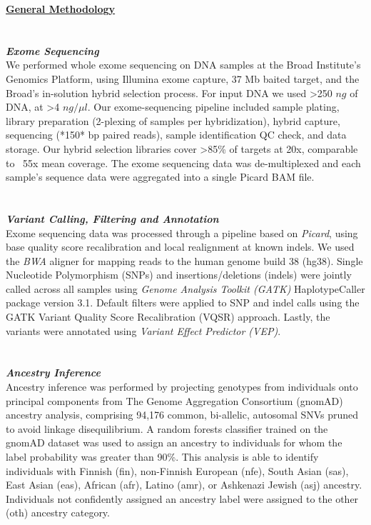 {\Large \textbf{\underline{General Methodology}}}
\\ \\ \\
{\large \textbf{\textit{Exome Sequencing}}}
\\
We performed whole exome sequencing on DNA samples at the Broad Institute's Genomics Platform, using Illumina exome capture, 37 Mb baited target, and the Broad's in-solution hybrid selection process. For input DNA we used \textgreater250 $ng$ of DNA, at \textgreater4 $ng/\mu l$. Our exome-sequencing pipeline included sample plating, library preparation (2-plexing of samples per hybridization), hybrid capture, sequencing (*150* bp paired reads), sample identification QC check, and data storage. Our hybrid selection libraries cover \textgreater85\% of targets at 20x, comparable to ~55x mean coverage. The exome sequencing data was de-multiplexed and each sample's sequence data were aggregated into a single Picard BAM file.
\\ \\ \\
{\large \textbf{\textit{Variant Calling, Filtering and Annotation}}}
\\
Exome sequencing data was processed through a pipeline based on \textit{Picard}, using base quality score recalibration and local 
realignment at known indels. We used the \textit{BWA} aligner for mapping reads to the human genome build 38 (hg38). Single Nucleotide Polymorphism (SNPs) 
and insertions/deletions (indels) were jointly called across all samples using \textit{Genome Analysis Toolkit (GATK)} HaplotypeCaller package version 3.1. 
Default filters were applied to SNP and indel calls using the GATK Variant Quality Score Recalibration (VQSR) approach. 
Lastly, the variants were annotated using \textit{Variant Effect Predictor (VEP)}.
\\ \\ \\
{\large \textbf{\textit{Ancestry Inference}}}
\\
Ancestry inference was performed by projecting genotypes from individuals onto principal components from The Genome Aggregation Consortium (gnomAD) ancestry analysis, comprising 94,176 common, bi-allelic, autosomal SNVs pruned to avoid linkage disequilibrium. A random forests classifier trained on the gnomAD dataset was used to assign an ancestry to individuals for whom the label probability was greater than 90\%. This analysis is able to identify individuals with Finnish (fin), non-Finnish European (nfe), South Asian (sas), East Asian (eas), African (afr), Latino (amr), or Ashkenazi Jewish (asj) ancestry. Individuals not confidently assigned an ancestry label were assigned to the other (oth) ancestry category. 
